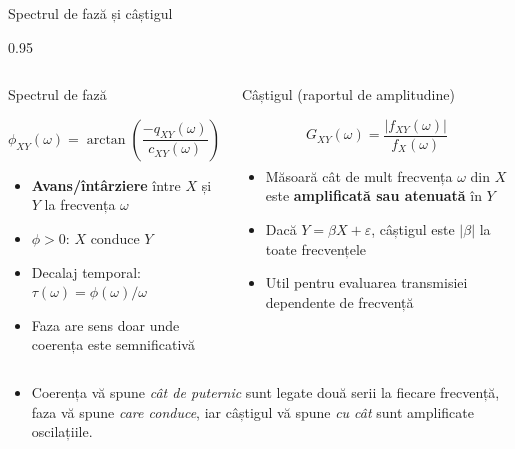 \documentclass[9pt, aspectratio=169, t]{beamer}
\begin{document}
\begin{frame}{Spectrul de fază și câștigul}
    \begin{cminipage}{0.95\textwidth}
    \vspace{-2mm}
    \begin{columns}[T]
        \begin{block}{Spectrul de fază}
            {\small
            \[
                \phi_{XY}(\omega) = \arctan\!\left(\frac{-q_{XY}(\omega)}{c_{XY}(\omega)}\right)
            \]
            \begin{itemize}\setlength{\itemsep}{0pt}
                \item \textbf{Avans/întârziere} între $X$ și $Y$ la frecvența $\omega$
                \item $\phi > 0$: $X$ conduce $Y$
                \item Decalaj temporal: $\tau(\omega) = \phi(\omega)/\omega$
                \item Faza are sens doar unde coerența este semnificativă
            \end{itemize}}
        \end{block}

        \begin{block}{Câștigul (raportul de amplitudine)}
            {\small
            \[
                G_{XY}(\omega) = \frac{|f_{XY}(\omega)|}{f_X(\omega)}
            \]
            \begin{itemize}\setlength{\itemsep}{0pt}
                \item Măsoară cât de mult frecvența $\omega$ din $X$ este \textbf{amplificată sau atenuată} în $Y$
                \item Dacă $Y = \beta X + \varepsilon$, câștigul este $|\beta|$ la toate frecvențele
                \item Util pentru evaluarea transmisiei dependente de frecvență
            \end{itemize}}
        \end{block}
    \end{columns}
    \vspace{1mm}
    \begin{itemize}\setlength{\itemsep}{0pt}
        \item[\textbf{Împreună}:] Coerența vă spune \textit{cât de puternic} sunt legate două serii la fiecare frecvență, faza vă spune \textit{care conduce}, iar câștigul vă spune \textit{cu cât} sunt amplificate oscilațiile.
    \end{itemize}
    \end{cminipage}
\end{frame}
\end{document}
